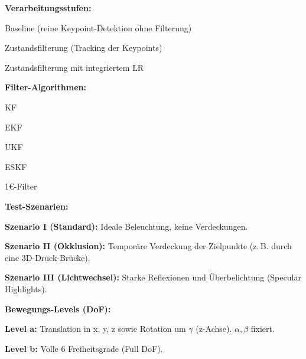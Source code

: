 \begin{listNorm}
    \item \textbf{Verarbeitungsstufen:}
    \begin{listNorm}
        \item Baseline (reine Keypoint-Detektion ohne Filterung)
        \item Zustandsfilterung (Tracking der Keypoints)
        \item Zustandsfilterung mit integriertem \ac{LR}
    \end{listNorm}
    
    \item \textbf{Filter-Algorithmen:} 
    \begin{listNorm}
        \item \acf{KF}
        \item \acf{EKF}
        \item \acf{UKF}
        \item \acf{ESKF}
        \item 1\euro{}-Filter
    \end{listNorm}
    
    \item \textbf{Test-Szenarien:}
    \begin{listNorm}
        \item \textbf{Szenario I (Standard):} Ideale Beleuchtung, keine Verdeckungen.
        \item \textbf{Szenario II (Okklusion):} Temporäre Verdeckung der Zielpunkte (z.\,B. durch eine 3D-Druck-Brücke).
        \item \textbf{Szenario III (Lichtwechsel):} Starke Reflexionen und Überbelichtung (Specular Highlights).
    \end{listNorm}
    
    \item \textbf{Bewegungs-Levels (\ac{DoF}):}
    \begin{listNorm}
        \item \textbf{Level a:} Translation in x, y, z sowie Rotation um $\gamma$ (z-Achse). $\alpha, \beta$ fixiert.
        \item \textbf{Level b:} Volle 6 Freiheitsgrade (Full \ac{DoF}).
    \end{listNorm}


\end{listNorm}
